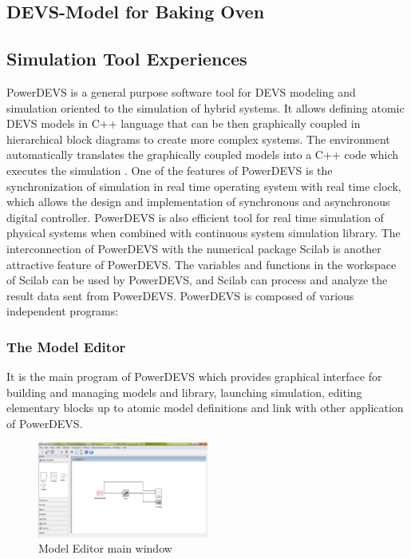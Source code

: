 \documentclass[titlepage]{article}%
\begin{document}
\subsection{DEVS-Model for Baking Oven}
\subsection{Simulation Tool Experiences}


PowerDEVS is a general purpose software tool for DEVS modeling and simulation oriented to the simulation of hybrid systems. It allows defining atomic DEVS models in C++ language that can be then graphically coupled in hierarchical block diagrams to create more complex systems. The environment automatically translates the graphically coupled models into a C++ code which executes the simulation \cite{BK11}.
One of the features of PowerDEVS is the synchronization of simulation in real time operating system with real time clock, which allows the design and implementation of synchronous and asynchronous digital controller. PowerDEVS is also efficient tool for real time simulation of physical systems when combined with continuous system simulation library. The interconnection of PowerDEVS with the numerical package Scilab is another attractive feature of PowerDEVS. The variables and functions in the workspace of Scilab can be used by PowerDEVS, and Scilab can process and analyze the result data sent from PowerDEVS.
PowerDEVS is composed of various independent programs: 



\subsubsection{The Model Editor} 
It is the main program of PowerDEVS which provides graphical interface for building and managing models and library, launching simulation, editing elementary blocks up to atomic model definitions and link with other application of PowerDEVS. 
 
 
 \begin{figure}[h!]
  \centering
    \includegraphics[width=0.5\textwidth]{Fig2.png}
    \caption{Model Editor main window}
    \label{model_edt}
\end{figure}
 
\end{document}

